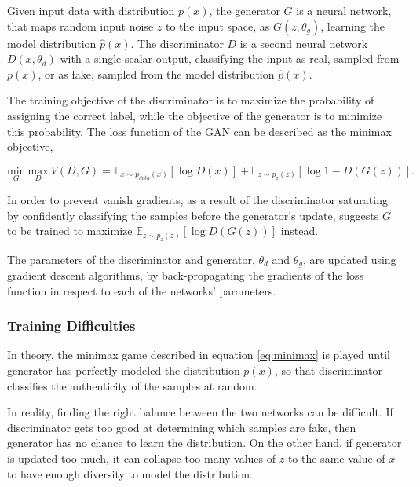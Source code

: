 \documentclass{article}
\begin{document}
Given input data with distribution $p(x)$, the generator $G$ is a neural network, that maps random input noise $z$ to the input space, as $G(z, \theta_{g})$, learning the model distribution $\hat{p}(x)$. The discriminator $D$ is a second neural network $D(x, \theta_{d})$ with a single scalar output, classifying the input as real, sampled from $p(x)$, or as fake, sampled from the model distribution $\hat{p}(x)$. 

The training objective of the discriminator is to maximize the probability of assigning the correct label, while the objective of the generator is to minimize this probability. The loss function of the GAN can be described as the minimax objective,

\begin{equation}
\underset{G}{\mathrm{min}} \ \underset{D}{\mathrm{max}} \ V(D,G) = \mathbb{E}_{x \sim p_{data}(x)}[\log D(x)] + \mathbb{E}_{z \sim p_{z}(z)}[\log 1 - D(G(z))].
\label{eq:minimax}
\end{equation}

In order to prevent vanish gradients, as a result of the discriminator saturating by confidently classifying the samples before the generator's update, \cite{goodfellow_generative_2014} suggests $G$ to be trained to maximize $\mathbb{E}_{z \sim p_{z}(z)}[\log D(G(z))]$ instead.

The parameters of the discriminator and generator, $\theta_{d}$ and $\theta_{g}$, are updated using gradient descent algorithms, by back-propagating the gradients of the loss function in respect to each of the networks' parameters. 


\subsubsection{Training Difficulties}
In theory, the minimax game described in equation \ref{eq:minimax} is played until generator has perfectly modeled the distribution $p(x)$, so that discriminator classifies the authenticity of the samples at random. 

In reality, finding the right balance between the two networks can be difficult. If discriminator gets too good at determining which samples are fake, then generator has no chance to learn the distribution. On the other hand, if generator is updated too much, it can collapse too many values of $z$ to the same value of $x$ to have enough diversity to model the distribution. 
\end{document}
